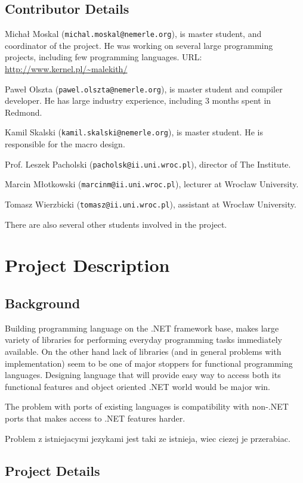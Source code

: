 \documentclass[a4paper,11pt]{article}
\begin{document}
\subsection{Contributor Details}

Micha{\l} Moskal (\texttt{michal.moskal@nemerle.org}), is master
student, and coordinator of the project. He was working on several large
programming projects, including few programming languages. URL: 
\url{http://www.kernel.pl/~malekith/}

Pawe{\l} Olszta (\texttt{pawel.olszta@nemerle.org}), is master student
and compiler developer. He has large industry experience, including
3 months spent in Redmond. 

Kamil Skalski (\texttt{kamil.skalski@nemerle.org}), is master student.
He is responsible for the macro design.

Prof. Leszek Pacholski (\texttt{pacholsk@ii.uni.wroc.pl}), director of The Institute.

Marcin M\l otkowski (\texttt{marcinm@ii.uni.wroc.pl}), lecturer at Wroc\l aw University.

Tomasz Wierzbicki (\texttt{tomasz@ii.uni.wroc.pl}), assistant at Wroc\l aw University.

There are also several other students involved in the project.


\section{Project Description}

\subsection{Background}
Building programming language on the .NET framework base, makes large
variety of libraries for performing everyday programming tasks immediately
available. On the other hand lack of libraries (and in general problems
with implementation) seem to be one of major stoppers for functional
programming languages. Designing language that will provide easy way
to access both its functional features and object oriented .NET world
would be major win.

The problem with ports of existing languages is compatibility with
non-.NET ports that makes access to .NET features harder.

Problem z istniejacymi jezykami jest taki ze istnieja, wiec ciezej je przerabiac.

\subsection{Project Details}
\end{document}
